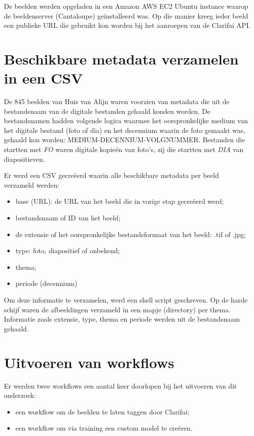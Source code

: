 De beelden werden opgeladen in een Amazon AWS EC2 Ubuntu instance waarop de beeldenserver (Cantaloupe) ge\"{i}nstalleerd was. Op die manier kreeg ieder beeld een publieke URL die gebruikt kon worden bij het aanroepen van de Clarifai API.

\section{Beschikbare metadata verzamelen in een CSV}
\label{sec:metadata-verzamelen-csv}

De 845 beelden van Huis van Alijn waren voorzien van metadata die uit de bestandsnaam van de digitale bestanden gehaald konden worden. De bestandsnamen hadden volgende logica waarmee het oorspronkelijke medium van het digitale bestand (foto of dia) en het decennium waarin de foto gemaakt was, gehaald kon worden: MEDIUM-DECENNIUM-VOLGNUMMER. Bestanden die startten met \textit{FO} waren digitale kopieën van foto’s, zij die startten met \textit{DIA} van diapositieven. 

Er werd een CSV gecreëerd waarin alle beschikbare metadata per beeld verzameld werden:
\begin{itemize}
	\item base (URL): de URL van het beeld die in vorige stap gecreëerd werd;
	\item bestandsnaam of ID van het beeld;
	\item de extensie of het oorspronkelijke bestandsformaat van het beeld: .tif of .jpg;
	\item type: foto, diapositief of onbekend;
	\item thema;
	\item periode (decennium)
\end{itemize}

Om deze informatie te verzamelen, werd een shell script geschreven. Op de harde schijf waren de afbeeldingen verzameld in een mapje (directory) per thema. Informatie zoals extensie, type, thema en periode werden uit de bestandsnaam gehaald. 

\section{Uitvoeren van workflows}
\label{sec:uitvoeren-workflows}

Er werden twee workflows een aantal keer doorlopen bij het uitvoeren van dit onderzoek:
\begin{itemize}
	\item een workflow om de beelden te laten taggen door Clarifai;
	\item een workflow om via training een custom model te cre\"{e}ren.
\end{itemize}


